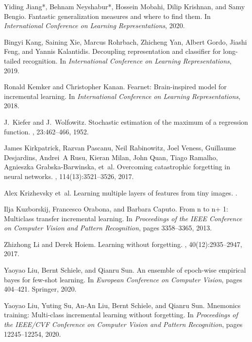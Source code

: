 \documentclass{article}
\begin{document}
\begin{thebibliography}{10}
Yiding Jiang*, Behnam Neyshabur*, Hossein Mobahi, Dilip Krishnan, and Samy
  Bengio.
\newblock Fantastic generalization measures and where to find them.
\newblock In {\em International Conference on Learning Representations}, 2020.

Bingyi Kang, Saining Xie, Marcus Rohrbach, Zhicheng Yan, Albert Gordo, Jiashi
  Feng, and Yannis Kalantidis.
\newblock Decoupling representation and classifier for long-tailed recognition.
\newblock In {\em International Conference on Learning Representations}, 2019.

Ronald Kemker and Christopher Kanan.
\newblock Fearnet: Brain-inspired model for incremental learning.
\newblock In {\em International Conference on Learning Representations}, 2018.

J.~Kiefer and J.~Wolfowitz.
\newblock Stochastic estimation of the maximum of a regression function.
, 23:462--466, 1952.

James Kirkpatrick, Razvan Pascanu, Neil Rabinowitz, Joel Veness, Guillaume
  Desjardins, Andrei~A Rusu, Kieran Milan, John Quan, Tiago Ramalho, Agnieszka
  Grabska-Barwinska, et~al.
\newblock Overcoming catastrophic forgetting in neural networks.
,
  114(13):3521--3526, 2017.

Alex Krizhevsky et~al.
\newblock Learning multiple layers of features from tiny images.
.

Ilja Kuzborskij, Francesco Orabona, and Barbara Caputo.
\newblock From n to n+ 1: Multiclass transfer incremental learning.
\newblock In {\em Proceedings of the IEEE Conference on Computer Vision and
  Pattern Recognition}, pages 3358--3365, 2013.

Zhizhong Li and Derek Hoiem.
\newblock Learning without forgetting.
,
  40(12):2935--2947, 2017.

Yaoyao Liu, Bernt Schiele, and Qianru Sun.
\newblock An ensemble of epoch-wise empirical bayes for few-shot learning.
\newblock In {\em European Conference on Computer Vision}, pages 404--421.
  Springer, 2020.

Yaoyao Liu, Yuting Su, An-An Liu, Bernt Schiele, and Qianru Sun.
\newblock Mnemonics training: Multi-class incremental learning without
  forgetting.
\newblock In {\em Proceedings of the IEEE/CVF Conference on Computer Vision and
  Pattern Recognition}, pages 12245--12254, 2020.


\end{thebibliography}
\end{document}
